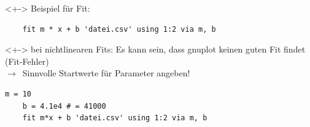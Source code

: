 \begin{frame}[<+->][fragile]

	\begin{visibleenv}<+->
	Beispiel für Fit:
	\begin{lstlisting}
	fit m * x + b 'datei.csv' using 1:2 via m, b
	\end{lstlisting}
	\end{visibleenv}

	\begin{visibleenv}<+->
	 bei nichtlinearen Fits: Es kann sein, dass gnuplot keinen guten Fit findet (Fit-Fehler)\\
	$\rightarrow$~Sinnvolle Startwerte für Parameter angeben!
	\begin{lstlisting}[gobble=4]
	m = 10
	b = 4.1e4 # = 41000
	fit m*x + b 'datei.csv' using 1:2 via m, b
	\end{lstlisting}
	\end{visibleenv}


\end{frame}
